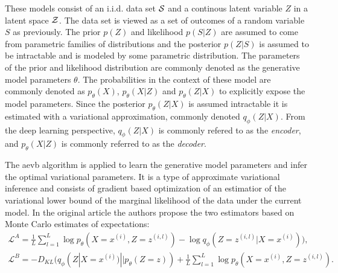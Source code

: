 These models consist of an i.i.d. data set $\mathcal{S}$ and a continous latent variable $Z$ in a latent space $\mathcal{Z}$. The data set is viewed as a set of outcomes of a random variable $S$ as previously. The prior $p(Z)$ and likelihood $p(S|Z)$ are assumed to come from parametric families of distributions and the posterior $p(Z|S)$ is assumed to be intractable and is modeled by some parametric distribution. The parameters of the prior and likelihood distribution are commonly denoted as the generative model parameters $\theta$. The probabilities in the context of these model are commonly denoted as $p_\theta(X)$, $p_\theta(X|Z)$ and $p_\theta(Z|X)$ to explicitly expose the model parameters. Since the posterior $p_\theta(Z|X)$ is assumed intractable it is estimated with a variational approximation, commonly denoted $q_\phi(Z|X)$. From the deep learning perspective, $q_\phi(Z|X)$ is commonly refered to as the \textit{encoder}, and $p_\theta(X|Z)$ is commonly referred to as the \textit{decoder}.

The \acrshort{aevb} algorithm is applied to learn the generative model parameters and infer the optimal variational parameters. It is a type of approximate variational inference and consists of gradient based optimization of an estimatior of the variational lower bound of the marginal likelihood of the data under the current model. In the original article the authors propose the two estimators based on Monte Carlo estimates of expectations:
\begin{equation}
    \label{eq:VAEstimators}
    \begin{aligned}
        \mathcal{L}^A = \frac{1}{L}\sum_{l=1}^L \log p_\theta (X=x^{(i)},Z=z^{(i, l)}) - \log q_\phi (Z=z^{(i, l)} | X=x^{(i)}) ), \\
        \mathcal{L}^B = - D_{KL}(q_\phi (Z | X=x^{(i)}) || p_\theta(Z=z)) + \frac{1}{L}\sum_{l=1}^L \log p_\theta (X=x^{(i)},Z=z^{(i, l)}).
    \end{aligned}
\end{equation}

